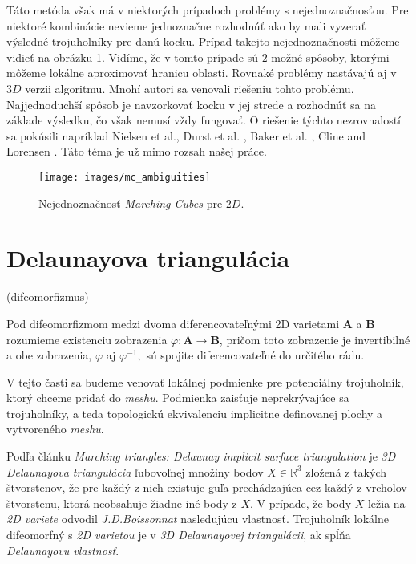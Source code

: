 Táto metóda však má v niektorých prípadoch problémy s nejednoznačnosťou. Pre niektoré kombinácie
nevieme jednoznačne rozhodnúť ako by mali vyzerať výsledné trojuholníky pre danú kocku. Prípad takejto
nejednoznačnosti môžeme vidieť na obrázku \ref{obr:mc_ambiguities}. Vidíme, že v tomto prípade sú $2$ 
možné spôsoby, ktorými môžeme lokálne aproximovať hranicu oblasti. Rovnaké problémy nastávajú aj v $3D$
verzii algoritmu. Mnohí autori sa venovali riešeniu tohto problému. Najjednoduchší spôsob je navzorkovať
kocku v jej strede a rozhodnúť sa na základe výsledku, čo však nemusí vždy fungovať. O riešenie týchto 
nezrovnalostí sa pokúsili napríklad Nielsen et al.\cite{nielson1991asymptotic},
Durst et al. \cite{durst1988re}, Baker et al. \cite{baker1989building},
Cline and Lorensen \cite{cline1988two}. Táto téma je už mimo rozsah našej práce.

\begin{figure}
    \centerline{\texttt{[image: images/mc\_ambiguities]}}
    \caption[Nejednoznačnosť Marching Cubes]{Nejednoznačnosť \textit{Marching Cubes} pre $2D$.}
    \label{obr:mc_ambiguities}
\end{figure}



\section{Delaunayova triangulácia}
\label{kap:delaunay_triangulation}

\begin{definition}
    (difeomorfizmus)

    Pod difeomorfizmom medzi dvoma diferencovateľnými 2D varietami $\mathbf{A}$ a $\mathbf{B}$ 
    rozumieme existenciu zobrazenia $\varphi : \mathbf{A} \to \mathbf{B}$, pričom toto zobrazenie 
    je invertibilné a obe zobrazenia, $\varphi$ aj $\varphi^{-1},$ sú spojite diferencovateľné do určitého rádu. 
\end{definition}

V tejto časti sa budeme venovať lokálnej podmienke pre potenciálny trojuholník, ktorý chceme pridať do 
\textit{meshu}. Podmienka zaisťuje neprekrývajúce sa trojuholníky, a teda topologickú 
ekvivalenciu implicitne definovanej plochy a vytvoreného \textit{meshu}.

Podľa článku \textit{Marching triangles: Delaunay implicit surface triangulation} \cite{hilton1997marching} 
je \textit{3D Delaunayova triangulácia} ľubovoľnej množiny bodov $X\in \mathbb{R}^3$
zložená z takých štvorstenov, že pre každý z nich existuje guľa prechádzajúca cez každý z vrcholov 
štvorstenu, ktorá neobsahuje žiadne iné body z $X$. V prípade, že body $X$ ležia na \textit{2D variete} 
odvodil \textit{J.D.Boissonnat} \cite{boissonnat1984geometric} nasledujúcu vlastnosť. Trojuholník
lokálne difeomorfný s \textit{2D varietou} je v \textit{3D Delaunayovej triangulácii}, ak spĺňa 
\textit{Delaunayovu vlastnosť}.

